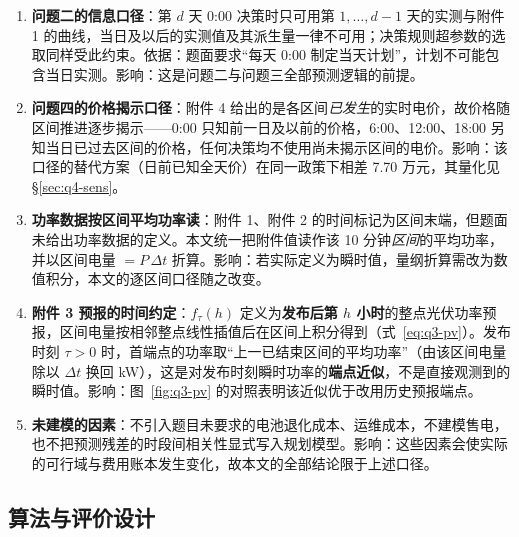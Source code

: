 \begin{enumerate}
  \item \textbf{问题二的信息口径}：第 $d$ 天 0:00 决策时只可用第 $1,\dots,d-1$ 天的实测与附件 1 的曲线，当日及以后的实测值及其派生量一律不可用；决策规则超参数的选取同样受此约束。依据：题面要求``每天 0:00 制定当天计划''，计划不可能包含当日实测。影响：这是问题二与问题三全部预测逻辑的前提。
  \item \textbf{问题四的价格揭示口径}：附件 4 给出的是各区间\emph{已发生}的实时电价，故价格随区间推进逐步揭示——0:00 只知前一日及以前的价格，6:00、12:00、18:00 另知当日已过去区间的价格，任何决策均不使用尚未揭示区间的电价。影响：该口径的替代方案（日前已知全天价）在同一政策下相差 7.70 万元，其量化见 \S\ref{sec:q4-sens}。
  \item \textbf{功率数据按区间平均功率读}：附件 1、附件 2 的时间标记为区间末端，但题面未给出功率数据的定义。本文统一把附件值读作该 10 分钟\emph{区间}的平均功率，并以区间电量 $=P\,\Delta t$ 折算。影响：若实际定义为瞬时值，量纲折算需改为数值积分，本文的逐区间口径随之改变。
  \item \textbf{附件 3 预报的时间约定}：$f_\tau(h)$ 定义为\textbf{发布后第 $h$ 小时}的整点光伏功率预报，区间电量按相邻整点线性插值后在区间上积分得到（式~\eqref{eq:q3-pv}）。发布时刻 $\tau>0$ 时，首端点的功率取``上一已结束区间的平均功率''（由该区间电量除以 $\Delta t$ 换回 kW），这是对发布时刻瞬时功率的\textbf{端点近似}，不是直接观测到的瞬时值。影响：图~\ref{fig:q3-pv} 的对照表明该近似优于改用历史预报端点。
  \item \textbf{未建模的因素}：不引入题目未要求的电池退化成本、运维成本，不建模售电，也不把预测残差的时段间相关性显式写入规划模型。影响：这些因素会使实际的可行域与费用账本发生变化，故本文的全部结论限于上述口径。
\end{enumerate}

\subsection{算法与评价设计}

